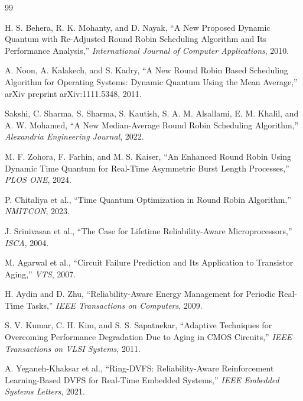 \documentclass[12pt,a4paper]{article}
\begin{document}
\newpage
\begin{thebibliography}{99}

H. S. Behera, R. K. Mohanty, and D. Nayak,
``A New Proposed Dynamic Quantum with Re-Adjusted Round Robin Scheduling Algorithm and Its Performance Analysis,''
\textit{International Journal of Computer Applications}, 2010.

A. Noon, A. Kalakech, and S. Kadry,
``A New Round Robin Based Scheduling Algorithm for Operating Systems: Dynamic Quantum Using the Mean Average,''
arXiv preprint arXiv:1111.5348, 2011.

Sakshi, C. Sharma, S. Sharma, S. Kautish, S. A. M. Alsallami, E. M. Khalil, and A. W. Mohamed,
``A New Median-Average Round Robin Scheduling Algorithm,''
\textit{Alexandria Engineering Journal}, 2022.

M. F. Zohora, F. Farhin, and M. S. Kaiser,
``An Enhanced Round Robin Using Dynamic Time Quantum for Real-Time Asymmetric Burst Length Processes,''
\textit{PLOS ONE}, 2024.

P. Chitaliya et al.,
``Time Quantum Optimization in Round Robin Algorithm,''
\textit{NMITCON}, 2023.

J. Srinivasan et al.,
``The Case for Lifetime Reliability-Aware Microprocessors,''
\textit{ISCA}, 2004.

M. Agarwal et al.,
``Circuit Failure Prediction and Its Application to Transistor Aging,''
\textit{VTS}, 2007.

H. Aydin and D. Zhu,
``Reliability-Aware Energy Management for Periodic Real-Time Tasks,''
\textit{IEEE Transactions on Computers}, 2009.

S. V. Kumar, C. H. Kim, and S. S. Sapatnekar,
``Adaptive Techniques for Overcoming Performance Degradation Due to Aging in CMOS Circuits,''
\textit{IEEE Transactions on VLSI Systems}, 2011.

A. Yeganeh-Khaksar et al.,
``Ring-DVFS: Reliability-Aware Reinforcement Learning-Based DVFS for Real-Time Embedded Systems,''
\textit{IEEE Embedded Systems Letters}, 2021.

\end{thebibliography}
\end{document}
